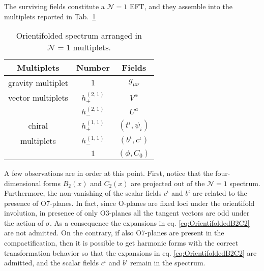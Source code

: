 \documentclass[12pt,a4paper]{book}
\begin{document}
The surviving fields constitute a $\mathcal{N} = 1$ EFT, and they assemble into the multiplets reported in Tab.~\ref{tab:OrientifoldedMultiplets}\\
\begin{table}
\begin{center}
\begin{tabular}{|c|c|c|}
\hline 
Multiplets & Number & Fields \\
\hline
gravity multiplet & $1$ & $g_{\mu\nu}$ \\
\hline
vector multiplets & $h^{(2,1)}_+$ & $V^\alpha$ \\
\hline
& $h^{(2,1)}_-$ & $U^a$ \\
\cline{2-3} chiral &
 $h^{(1,1)}_+$ & $(t^i, \psi_i)$ \\
 \cline{2-3} multiplets &
 $h^{(1,1)}_-$ & $(b^\iota, c^\iota)$ \\
\cline{2-3}
 & $1$ & $(\phi, C_0)$ \\
\hline
\end{tabular} 
\caption{\label{tab:OrientifoldedMultiplets} Orientifolded spectrum arranged in $\mathcal{N} = 1$ multiplets.}
\end{center}
\end{table}

A few observations are in order at this point. First, notice that the four-dimensional forms $B_2(x)$ and $C_2(x)$ are projected out of the $\mathcal{N} = 1$ spectrum. Furthermore, the non-vanishing of the scalar fields $c^\iota$ and $b^\iota$ are related to the presence of O7-planes. In fact, since O-planes are fixed loci under the orientifold involution, in presence of only O3-planes all the tangent vectors are odd under the action of $\sigma$. As a consequence the expansions in eq. \eqref{eq:OrientifoldedB2C2} are not admitted. On the contrary, if also O7-planes are present in the compactification, then it is possible to get harmonic forms with the correct transformation behavior so that the expansions in eq. \eqref{eq:OrientifoldedB2C2} are admitted, and the scalar fields $c^\iota$ and $b^\iota$ remain in the spectrum.\\
\end{document}
